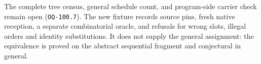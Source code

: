 The complete tree census, general schedule count, and program-side carrier check
remain open (\texttt{OQ-100.7}).  The new fixture records source pins, fresh native
reception, a separate combinatorial oracle, and refusals for wrong slots, illegal
orders and identity substitutions.  It does not supply the general assignment:
the equivalence is proved on the abstract sequential fragment and conjectural in
general.
